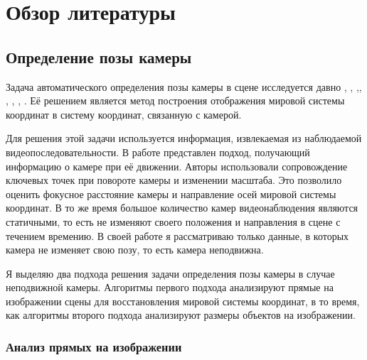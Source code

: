 \chapter{Обзор литературы}  \label{chapt1}

\section{Определение позы камеры}

Задача автоматического определения позы камеры в сцене исследуется давно \cite{caprile1990using}, \cite{li2010simultaneous}, \cite{liu2011surveillance} ,\cite{chen2007accurate}, \cite{pflugfelder2007people}, \cite{den2015automatic}, \cite{puwein2012ptz}, \cite{dubska2014automatic}. Её решением является метод построения отображения мировой системы координат в систему координат, связанную с камерой.

Для решения этой задачи используется информация, извлекаемая из наблюдаемой видеопоследовательности. В работе \cite{puwein2012ptz} представлен подход, получающий информацию о камере при её движении. Авторы использовали сопровождение ключевых точек при повороте камеры и изменении масштаба. Это позволило оценить фокусное расстояние камеры и направление осей мировой системы координат. В то же время большое количество камер видеонаблюдения являются статичными, то есть не изменяют своего положения и направления в сцене с течением времению. В своей работе я рассматриваю только данные, в которых камера не изменяет свою позу, то есть камера неподвижна.

Я выделяю два подхода решения задачи определения позы камеры в случае неподвижной камеры. Алгоритмы первого подхода анализируют прямые на изображении сцены для восстановления мировой системы координат, в то время, как алгоритмы второго подхода анализируют размеры объектов на изображении.

\subsection{Анализ прямых на изображении}

